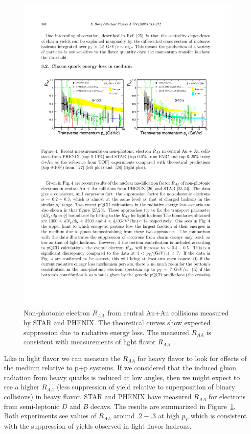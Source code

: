 \begin{figure}[htbp]
\begin{center}
\includegraphics[scale=1.8]{Plots/Intro/hf_raa.pdf}
\end{center}
\caption[NPE $R_{AA}$]{Non-photonic electron $R_{AA}$ from central Au+Au collisions measured by STAR and PHENIX. The theoretical curves show expected suppression due to radiative energy loss. The measured $R_{AA}$ is consistent with measurements of light flavor $R_{AA}$~\cite{NPERAA}.}
\label{fig:hf_raa}
\end{figure}

Like in light flavor we can measure the $R_{AA}$ for heavy flavor to look for effects of the medium relative to p+p systems. If we considered that the induced gluon radiation from heavy quarks is reduced at low angles, then we might expect to see a higher $R_{AA}$ (less suppression of yield relative to superposition of binary collisions) in heavy flavor. STAR and PHENIX have measured $R_{AA}$ for electrons from semi-leptonic $D$ and $B$ decays. The results are summarized in Figure~\ref{fig:hf_raa}. Both experiments see values of $R_{AA}$ around $.2-.3$ at high $p_T$ which is consistent with the suppression of yields observed in light flavor hadrons.

